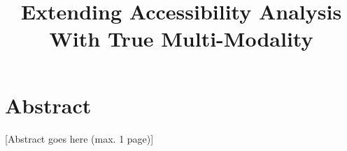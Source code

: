 \documentclass[a4paper, twoside, 12pt]{article}
\title{Extending Accessibility Analysis With True Multi-Modality}
\begin{document}




\clearpage
\thispagestyle{empty}
\section*{Abstract}

 [Abstract goes here (max. 1 page)]



\clearpage
{}
\tableofcontents
\clearpage
\listoffigures
\clearpage
\listoftables
\clearpage














\appendix
\renewcommand*{\thesection}{\Alph{section}}\textbf{}








\clearpage
\renewcommand*{\thesection}{}\textbf{}



\end{document}
